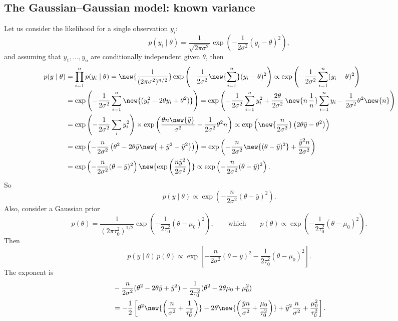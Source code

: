 \subsection{The Gaussian--Gaussian model: known variance}
Let us consider the likelihood for a single observation $y_i$:
\[
p(y_i \mid \theta) = \frac{1}{\sqrt{2\pi\sigma^2}}\exp\left(-\frac{1}{2\sigma^2}(y_i - \theta)^2\right),
\]
and assuming that $y_1, \dots, y_n$ are conditionally independent given $\theta$, then
\begin{align*}
p(y \mid \theta) &= \prod_{i=1}^{n} p(y_i \mid \theta) = \new{\frac{1}{(2\pi\sigma^2)^{n/2}}}\exp\left(-\frac{1}{2\sigma^2}\new{\sum_{i=1}^{n}}(y_i - \theta)^2\right)
\propto \exp\left(-\frac{1}{2\sigma^2}\sum_{i=1}^{n}(y_i - \theta)^2\right)\\
&= \exp\left(-\frac{1}{2\sigma^2}\sum_{i=1}^{n}\new{(y_i^2 - 2\theta y_i + \theta^2)}\right)
= \exp\left(-\frac{1}{2\sigma^2}\sum_{i=1}^{n}y_i^2 + \frac{2\theta}{2\sigma^2}\,\new{n\,\frac1n}\sum_{i=1}^{n}y_i - \frac{1}{2\sigma^2}\theta^2 \new{n}\right)\\
&= \exp\left(-\frac{1}{2\sigma^2}\sum_{i} y_i^2\right)\times\exp\left(\frac{\theta n\new{\bar y}}{\sigma^2} - \frac{1}{2\sigma^2}\theta^2 n\right)
\propto \exp\left(\new{\frac{n}{2\sigma^2}}\left(2\theta\bar y - \theta^2\right)\right)\\
&= \exp\left(-\frac{n}{2\sigma^2}\left(\theta^2 - 2\theta\bar y \new{{}+ \bar y^2 - \bar y^2}\right)\right)
= \exp\left(-\frac{n}{2\sigma^2}\new{(\theta - \bar y)^2} + \frac{\bar y^2 n}{2\sigma^2}\right)\\
&= \exp\left(-\frac{n}{2\sigma^2}(\theta - \bar y)^2\right)\new{\exp\left(\frac{n\bar y^2}{2\sigma^2}\right)}
\propto \exp\left(-\frac{n}{2\sigma^2}(\theta - \bar y)^2\right).
\end{align*}
So
\[
p(y \mid \theta) \propto \exp\left(-\frac{n}{2\sigma^2}(\theta - \bar y)^2\right).
\]
Also, consider a Gaussian prior
\[
p(\theta) = \frac{1}{(2\pi\tau_0^2)^{1/2}}\exp\left(-\frac{1}{2\tau_0^2}(\theta - \mu_0)^2\right),
\qquad\text{which}\qquad
p(\theta) \propto \exp\left(-\frac{1}{2\tau_0^2}(\theta - \mu_0)^2\right).
\]
Then
\[
p(y \mid \theta)\,p(\theta) \propto \exp\left[-\frac{n}{2\sigma^2}(\theta - \bar y)^2 - \frac{1}{2\tau_0^2}(\theta - \mu_0)^2\right].
\]
The exponent is
\begin{align*}
&-\frac{n}{2\sigma^2}(\theta^2 - 2\theta\bar y + \bar y^2) - \frac{1}{2\tau_0^2}(\theta^2 - 2\theta\mu_0 + \mu_0^2)\\
&= -\frac12\left[\theta^2\new{\left(\frac{n}{\sigma^2} + \frac{1}{\tau_0^2}\right)} - 2\theta\new{\left(\frac{\bar y n}{\sigma^2} + \frac{\mu_0}{\tau_0^2}\right)} + \bar y^2\frac{n}{\sigma^2} + \frac{\mu_0^2}{\tau_0^2}\right].
\end{align*}
